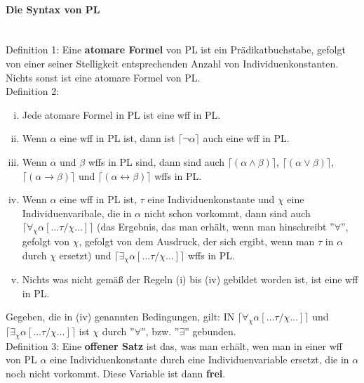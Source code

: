 \documentclass{scrartcl}
\begin{document}
\paragraph{Die Syntax von PL} \mbox{}\\

Definition 1: Eine \textbf{atomare Formel} von PL ist ein Prädikatbuchstabe, gefolgt von einer seiner Stelligkeit entsprechenden Anzahl von Individuenkonstanten. Nichts sonst ist eine atomare Formel von PL. \\

Definition 2:
\begin{enumerate}[(i)]
	\item Jede atomare Formel in PL ist eine wff in PL.
	\item Wenn $ \alpha $ eine wff in PL ist, dann ist $ \lceil \neg \alpha \rceil $ auch eine wff in PL.
	\item Wenn $ \alpha $ und $ \beta $ wffs in PL sind, dann sind auch $ \lceil (\alpha \wedge \beta) \rceil $, $ \lceil (\alpha \vee \beta) \rceil $, $ \lceil (\alpha \rightarrow \beta) \rceil $ und $ \lceil (\alpha \leftrightarrow \beta) \rceil $ wffs in PL.
	\item Wenn $ \alpha $ eine wff in PL ist, $ \tau $ eine Individuenkonstante und $ \chi $ eine Individuenvaribale, die in $ \alpha $ nicht schon vorkommt, dann sind auch $ \lceil \forall_\chi \alpha [\ldots \tau / \chi \ldots] \rceil $ (das Ergebnis, das man erhält, wenn man hinschreibt ''$ \forall $'', gefolgt von $ \chi $, gefolgt von dem Ausdruck, der sich ergibt, wenn man $ \tau $ in $ \alpha $ durch $ \chi $ ersetzt) und $ \lceil \exists_\chi \alpha [\ldots \tau / \chi \ldots] \rceil $ wffs in PL.
	\item Nichts was nicht gemäß der Regeln (i) bis (iv) gebildet worden ist, ist eine wff in PL.
\end{enumerate}

Gegeben, die in (iv) genannten Bedingungen, gilt: IN $ \lceil \forall_\chi \alpha [\ldots \tau / \chi \ldots] \rceil $ und $ \lceil \exists_\chi \alpha [\ldots \tau / \chi \ldots] \rceil $ ist $ \chi $ durch ''$ \forall $'', bzw. ''$ \exists $'' gebunden. \\

Definition 3: Eine \textbf{offener Satz} ist das, was man erhält, wen man in einer wff von PL $ \alpha $ eine Individuenkonstante durch eine Individuenvariable ersetzt, die in $ \alpha $ noch nicht vorkommt. Diese Variable ist dann \textbf{frei}. \\
\end{document}
